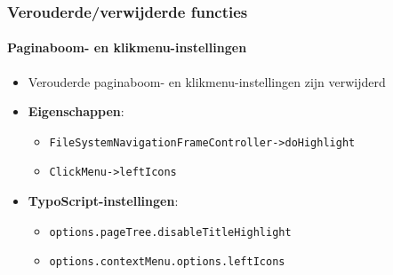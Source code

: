 
\begin{frame}[fragile]
	\frametitle{Verouderde/verwijderde functies}
	\framesubtitle{Paginaboom- en klikmenu-instellingen}

	\begin{itemize}

		\item Verouderde paginaboom- en klikmenu-instellingen zijn verwijderd
		\item \textbf{Eigenschappen}:

		\begin{itemize}
			\item \texttt{FileSystemNavigationFrameController->doHighlight}
			\item \texttt{ClickMenu->leftIcons}
		\end{itemize}

		\item \textbf{TypoScript-instellingen}:

		\begin{itemize}
			\item \texttt{options.pageTree.disableTitleHighlight}
			\item \texttt{options.contextMenu.options.leftIcons}
		\end{itemize}

	\end{itemize}

\end{frame}


